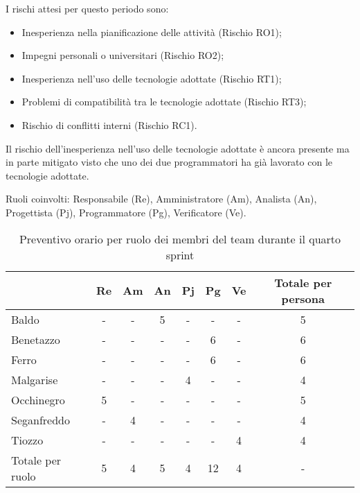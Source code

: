 I rischi attesi per questo periodo sono:
\begin{itemize}
    \item Inesperienza nella pianificazione delle attività (Rischio RO1);
    \item Impegni personali o universitari (Rischio RO2);
    \item Inesperienza nell'uso delle tecnologie adottate (Rischio RT1);
    \item Problemi di compatibilità tra le tecnologie adottate (Rischio RT3);
    \item Rischio di conflitti interni (Rischio RC1).
\end{itemize}
Il rischio dell'inesperienza nell'uso delle tecnologie adottate è ancora presente ma in parte mitigato visto che uno dei
due programmatori ha già lavorato con le tecnologie adottate.

Ruoli coinvolti: Responsabile (Re), Amministratore (Am), Analista (An), Progettista (Pj), Programmatore (Pg), Verificatore (Ve).
\begin{table}[!h]
    \centering
    \begin{tabular}{ | l | c | c | c | c | c | c | c | }
        \hline
        \textbf{} & \textbf{Re} & \textbf{Am} &\textbf{An} & \textbf{Pj} & \textbf{Pg} & \textbf{Ve} & \textbf{Totale per persona} \\
        \hline
        Baldo            &  -   &  -   &  5   &  -   &  -   &  -   &  5   \\
        Benetazzo        &  -   &  -   &  -   &  -   &  6   &  -   &  6   \\
        Ferro            &  -   &  -   &  -   &  -   &  6   &  -   &  6   \\
        Malgarise        &  -   &  -   &  -   &  4   &  -   &  -   &  4   \\
        Occhinegro       &  5   &  -   &  -   &  -   &  -   &  -   &  5   \\
        Seganfreddo      &  -   &  4   &  -   &  -   &  -   &  -   &  4   \\
        Tiozzo           &  -   &  -   &  -   &  -   &  -   &  4   &  4   \\
        \hline
        Totale per ruolo &  5   &  4   &  5   &  4   &  12   &  4   &  -   \\
        \hline
    \end{tabular}
    \caption{Preventivo orario per ruolo dei membri del team durante il quarto sprint}
    \label{tab:25}
\end{table}

